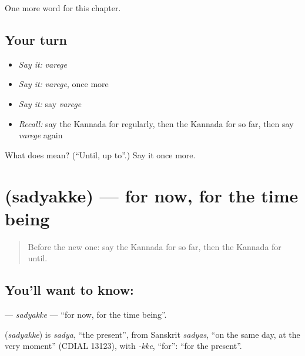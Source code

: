 \begin{grammarlens}[title={What you've built}]
One more word for this chapter.
\end{grammarlens}

\subsection*{Your turn}
\begin{itemize}
\raggedright
  \item \emph{Say it:} \emph{varege}
  \item \emph{Say it:} \emph{varege}, once more
  \item \emph{Say it:} say \emph{varege}
  \item \emph{Recall:} say the Kannada for regularly, then the Kannada for so far, then say \emph{varege} again
\end{itemize}

\begin{tcolorbox}[breakable,colback=teal!4,colframe=teal!35!black,title={Before you move on}]
What does  mean? (\textquotedblleft{}Until, up to\textquotedblright{}.) Say it once more.
\end{tcolorbox}
\section[\texorpdfstring{\kn{ಸದ್ಯಕ್ಕೆ} (sadyakke)}{ಸದ್ಯಕ್ಕೆ (sadyakke)}]{ (sadyakke) — for now, for the time being}

\label{lesson:KA-C211-sadyakke}



\begin{quote}
Before the new one: say the Kannada for so far, then the Kannada for until.
\end{quote}

\subsection*{You'll want to know: }
\textbf{} — \emph{sadyakke} — \textquotedblleft{}for now, for the time being\textquotedblright{}.

\begin{cousinweb}
\textbf{} (\emph{sadyakke}) is \emph{sadya}, \textquotedblleft{}the present\textquotedblright{}, from Sanskrit \emph{sadyas}, \textquotedblleft{}on the same day, at the very moment\textquotedblright{} (CDIAL 13123), with \emph{-kke}, \textquotedblleft{}for\textquotedblright{}: \textquotedblleft{}for the present\textquotedblright{}.
\end{cousinweb}

